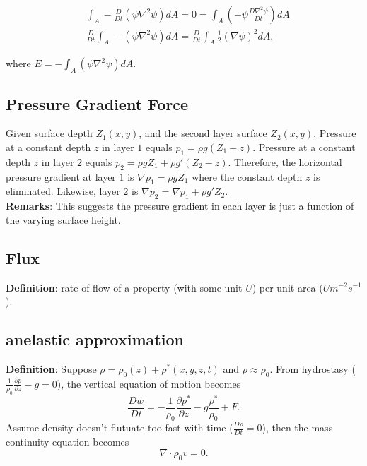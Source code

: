 \begin{equation}
   \begin{aligned}
      & \int_A -\frac{D}{Dt} (\psi \nabla^2\psi) dA= 0= \int_A \left( -\psi \frac{D\nabla^2\psi}{Dt} \right) dA \\
      & \frac{D}{Dt} \int_A -(\psi \nabla^2\psi) dA= \frac{D}{Dt} \int_A \frac{1}{2} (\nabla\psi)^2 dA,
   \end{aligned}
\end{equation}

where $E= -\int_A (\psi \nabla^2\psi) dA$.



\subsection{Pressure Gradient Force}
Given surface depth $Z_1(x,y)$, and the second layer surface $Z_2(x,y)$.
Pressure at a constant depth $z$ in layer $1$ equals $p_1= \rho g (Z_1- z)$.
Pressure at a constant depth $z$ in layer $2$ equals $p_2= \rho g Z_1 + \rho g' (Z_2- z)$.
Therefore, the horizontal pressure gradient at layer $1$ is $\nabla p_1= \rho g Z_1$ where the
constant depth $z$ is eliminated. Likewise, layer $2$ is $\nabla p_2= \nabla p_1 + \rho g' Z_2$. \\

{\bf Remarks}: This suggests the pressure gradient in each layer is just a function of the varying
surface height.


\subsection{Flux}
{\bf Definition}: rate of flow of a property (with some unit $U$) per unit area ($U m^{-2}s^{-1}$).

\subsection{anelastic approximation}
{\bf Definition}: Suppose $\rho = \rho_0(z) + \rho^*(x,y,z,t)$ and $\rho \approx \rho_0$. From
hydrostasy ($\frac{1}{\rho_0}\frac{\partial \bar{p}}{\partial z} - g = 0$), the vertical equation of
motion becomes
\begin{equation}
   \frac{Dw}{Dt} = - \frac{1}{\rho_0} \frac{\partial p^*}{\partial z} - g\frac{\rho^*}{\rho_0} + F.
\end{equation}
Assume density doesn't flutuate too fast with time ($\frac{D\rho}{Dt}=0$), then the mass continuity
equation becomes
\begin{equation}
   \nabla \cdot \rho_0 v = 0.
\end{equation}


